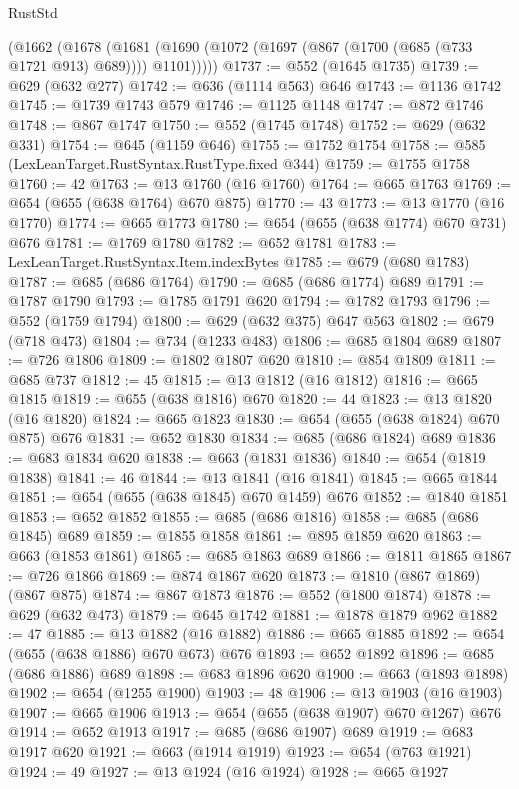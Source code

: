 \begin{lexlean}{RustStd}
\begin{coremodule}
{\begin{coremodule}
{{{{{{{{{{{{{{{    (@1662
      (@1678 (@1681 (@1690 (@1072 (@1697 (@867 (@1700 (@685 (@733 @1721 @913) @689)))) @1101)))))
@1737 := @552 (@1645 @1735)
@1739 := @629 (@632 @277)
@1742 := @636 (@1114 @563) @646
@1743 := @1136 @1742
@1745 := @1739 @1743 @579
@1746 := @1125 @1148
@1747 := @872 @1746
@1748 := @867 @1747
@1750 := @552 (@1745 @1748)
@1752 := @629 (@632 @331)
@1754 := @645 (@1159 @646)
@1755 := @1752 @1754
@1758 := @585 (LexLeanTarget.RustSyntax.RustType.fixed @344)
@1759 := @1755 @1758
@1760 := 42
@1763 := @13 @1760 (@16 @1760)
@1764 := @665 @1763
@1769 := @654 (@655 (@638 @1764) @670 @875)
@1770 := 43
@1773 := @13 @1770 (@16 @1770)
@1774 := @665 @1773
@1780 := @654 (@655 (@638 @1774) @670 @731) @676
@1781 := @1769 @1780
@1782 := @652 @1781
@1783 := LexLeanTarget.RustSyntax.Item.indexBytes
@1785 := @679 (@680 @1783)
@1787 := @685 (@686 @1764)
@1790 := @685 (@686 @1774) @689
@1791 := @1787 @1790
@1793 := @1785 @1791 @620
@1794 := @1782 @1793
@1796 := @552 (@1759 @1794)
@1800 := @629 (@632 @375) @647 @563
@1802 := @679 (@718 @473)
@1804 := @734 (@1233 @483)
@1806 := @685 @1804 @689
@1807 := @726 @1806
@1809 := @1802 @1807 @620
@1810 := @854 @1809
@1811 := @685 @737
@1812 := 45
@1815 := @13 @1812 (@16 @1812)
@1816 := @665 @1815
@1819 := @655 (@638 @1816) @670
@1820 := 44
@1823 := @13 @1820 (@16 @1820)
@1824 := @665 @1823
@1830 := @654 (@655 (@638 @1824) @670 @875) @676
@1831 := @652 @1830
@1834 := @685 (@686 @1824) @689
@1836 := @683 @1834 @620
@1838 := @663 (@1831 @1836)
@1840 := @654 (@1819 @1838)
@1841 := 46
@1844 := @13 @1841 (@16 @1841)
@1845 := @665 @1844
@1851 := @654 (@655 (@638 @1845) @670 @1459) @676
@1852 := @1840 @1851
@1853 := @652 @1852
@1855 := @685 (@686 @1816)
@1858 := @685 (@686 @1845) @689
@1859 := @1855 @1858
@1861 := @895 @1859 @620
@1863 := @663 (@1853 @1861)
@1865 := @685 @1863 @689
@1866 := @1811 @1865
@1867 := @726 @1866
@1869 := @874 @1867 @620
@1873 := @1810 (@867 @1869) (@867 @875)
@1874 := @867 @1873
@1876 := @552 (@1800 @1874)
@1878 := @629 (@632 @473)
@1879 := @645 @1742
@1881 := @1878 @1879 @962
@1882 := 47
@1885 := @13 @1882 (@16 @1882)
@1886 := @665 @1885
@1892 := @654 (@655 (@638 @1886) @670 @673) @676
@1893 := @652 @1892
@1896 := @685 (@686 @1886) @689
@1898 := @683 @1896 @620
@1900 := @663 (@1893 @1898)
@1902 := @654 (@1255 @1900)
@1903 := 48
@1906 := @13 @1903 (@16 @1903)
@1907 := @665 @1906
@1913 := @654 (@655 (@638 @1907) @670 @1267) @676
@1914 := @652 @1913
@1917 := @685 (@686 @1907) @689
@1919 := @683 @1917 @620
@1921 := @663 (@1914 @1919)
@1923 := @654 (@763 @1921)
@1924 := 49
@1927 := @13 @1924 (@16 @1924)
@1928 := @665 @1927
}}}}}}}}}}}}}}}
\end{coremodule}}
\end{coremodule}
\end{lexlean}
